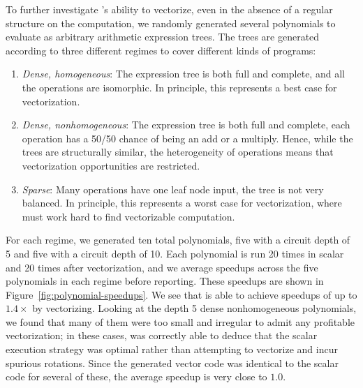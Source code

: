 To further investigate \system's ability to vectorize, even in the absence of a regular structure on the computation, we randomly generated several polynomials to evaluate as arbitrary arithmetic expression trees.
The trees are generated according to three different regimes to cover different kinds of programs: 
\begin{enumerate}
    \item {\em Dense, homogeneous}: The expression tree is both full and complete, and all the operations are isomorphic. In principle, this represents a best case for vectorization.
    \item {\em Dense, nonhomogeneous}: The expression tree is both full and complete, each operation has a 50/50 chance of being an add or a multiply. Hence, while the trees are structurally similar, the heterogeneity of operations means that vectorization opportunities are restricted.
	\item {\em Sparse}: Many operations have one leaf node input, the tree is not very balanced. In principle, this represents a worst case for vectorization, where \system must work hard to find vectorizable computation.
\end{enumerate}
For each regime, we generated ten total polynomials, five with a circuit depth of 5 and five with a circuit depth of 10.
Each polynomial is run 20 times in scalar and 20 times after vectorization, and we average speedups across the five polynomials in each regime before reporting.
These speedups are shown in Figure~\ref{fig:polynomial-speedups}.
We see that \system is able to achieve speedups of up to $1.4\times$ by vectorizing.
Looking at the depth 5 dense nonhomogeneous polynomials, we found that many of them were too small and irregular to admit any profitable vectorization; in these cases, \system was correctly able to deduce that the scalar execution strategy was optimal rather than attempting to vectorize and incur spurious rotations.
Since the generated vector code was identical to the scalar code for several of these, the average speedup is very close to $1.0$.


